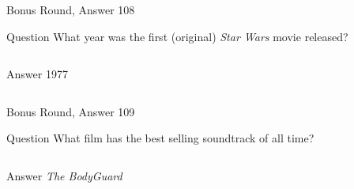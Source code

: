 \documentclass[11pt]{beamer}
\begin{document}
\begin{frame}[t]{Bonus Round, Answer 108}
\vspace{2em}
\begin{block}{Question}
What year was the first (original) \emph{Star Wars} movie released?
\end{block}
\pause{}
\begin{columns}[T,totalwidth=\linewidth]
\begin{column}{0.35\linewidth}
\begin{block}{Answer}
1977
\end{block}
\end{column}
\begin{column}{0.6\linewidth}
\begin{center}
\texttt{[image: \{Images/starwars]}.jpg}
\end{center}
\end{column}
\end{columns}
\end{frame}
    

\begin{frame}[t]{Bonus Round, Answer 109}
\vspace{2em}
\begin{block}{Question}
What film has the best selling soundtrack of all time?
\end{block}
\pause{}
\begin{columns}[T,totalwidth=\linewidth]
\begin{column}{0.35\linewidth}
\begin{block}{Answer}
\emph{The BodyGuard}
\end{block}
\end{column}
\begin{column}{0.6\linewidth}
\begin{center}
\texttt{[image: \{Images/bodyguard]}.jpg}
\end{center}
\end{column}
\end{columns}
\end{frame}
    
\end{document}
